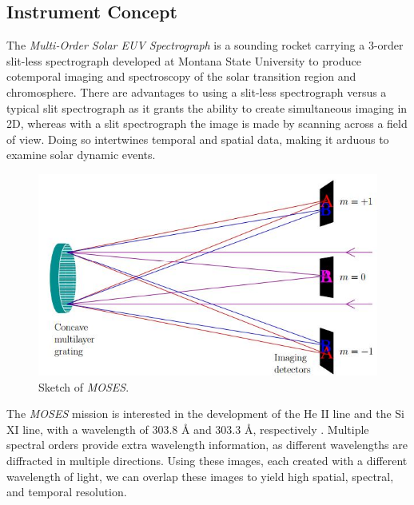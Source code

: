 \documentclass[10pt,a4paper,titlepage]{article}
\begin{document}
		\subsection{Instrument Concept}
			The \textit{Multi-Order Solar EUV Spectrograph} is a sounding rocket carrying a 3-order slit-less spectrograph developed at Montana State University to produce cotemporal imaging and spectroscopy of the solar transition region and chromosphere. There are advantages to using a slit-less spectrograph versus a typical slit spectrograph as it grants the ability to create simultaneous imaging in 2D, whereas with a slit spectrograph the image is made by scanning across a field of view. Doing so intertwines temporal and spatial data, making it arduous to examine solar dynamic events.
			\begin{figure}[H]
				\includegraphics[scale=0.5]{mosesconcept}
				\centering
				\caption{Sketch of \textit{MOSES}.\cite{MOSESPIC}}
				\centering
			\end{figure}
			The \textit{MOSES} mission is interested in the development of the He II line and the Si XI line, with a wavelength of 303.8 {\AA} and 303.3 {\AA}, respectively \cite{MOSES}. Multiple spectral orders provide extra wavelength information, as different wavelengths are diffracted in multiple directions. Using these images, each created with a different wavelength of light, we can overlap these images to yield high spatial, spectral, and temporal resolution.
			
\end{document}
